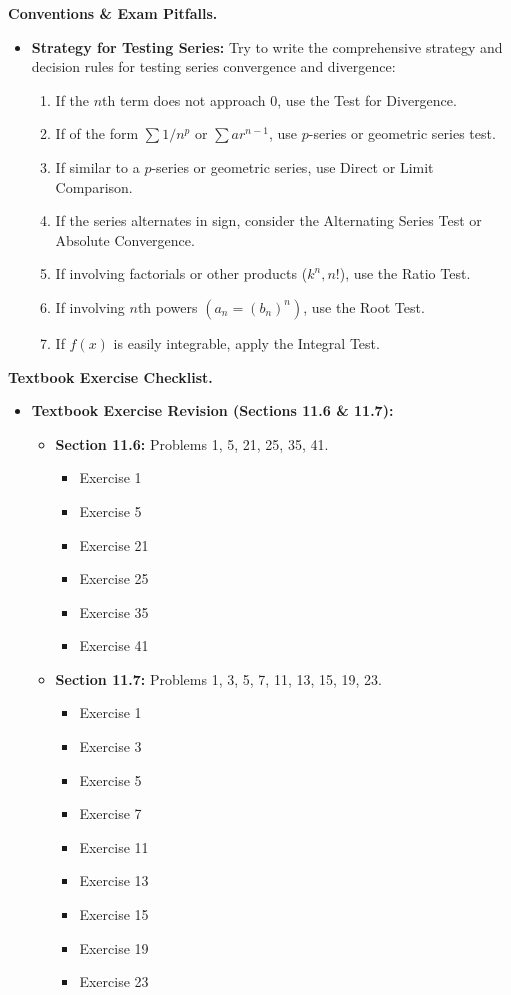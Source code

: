 \documentclass{../../../templates/natsirt}
\newenvironment{warningbox}[1][]{\begin{whitebox}[#1]\textbf{Conventions \& Exam Pitfalls. }}{\end{whitebox}}
\newenvironment{reviewbox}[1][]{\begin{whitebox}[#1]\textbf{Textbook Exercise Checklist. }}{\end{whitebox}}
\newcommand{\citem}{\item[$\square$]}
\begin{document}
\begin{warningbox}
    \begin{itemize}
        \citem \textbf{Strategy for Testing Series:} Try to write the comprehensive strategy and decision rules for testing series convergence and divergence:
        \begin{enumerate}
            \item If the $n$th term does not approach 0, use the Test for Divergence.
            \item If of the form $\sum 1/n^p$ or $\sum a r^{n-1}$, use $p$-series or geometric series test.
            \item If similar to a $p$-series or geometric series, use Direct or Limit Comparison.
            \item If the series alternates in sign, consider the Alternating Series Test or Absolute Convergence.
            \item If involving factorials or other products ($k^n, n!$), use the Ratio Test.
            \item If involving $n$th powers $(a_n = (b_n)^n)$, use the Root Test.
            \item If $f(x)$ is easily integrable, apply the Integral Test.
        \end{enumerate}
    \end{itemize}
\end{warningbox}

\begin{reviewbox}
    \begin{itemize}
        \citem \textbf{Textbook Exercise Revision (Sections 11.6 \& 11.7):}
        \begin{itemize}
            \citem \textbf{Section 11.6:} Problems 1, 5, 21, 25, 35, 41.
            \begin{itemize}
                \citem Exercise 1
                \citem Exercise 5
                \citem Exercise 21
                \citem Exercise 25
                \citem Exercise 35
                \citem Exercise 41
            \end{itemize}
            \citem \textbf{Section 11.7:} Problems 1, 3, 5, 7, 11, 13, 15, 19, 23.
            \begin{itemize}
                \citem Exercise 1
                \citem Exercise 3
                \citem Exercise 5
                \citem Exercise 7
                \citem Exercise 11
                \citem Exercise 13
                \citem Exercise 15
                \citem Exercise 19
                \citem Exercise 23
            \end{itemize}
        \end{itemize}
    \end{itemize}
\end{reviewbox}
\end{document}
